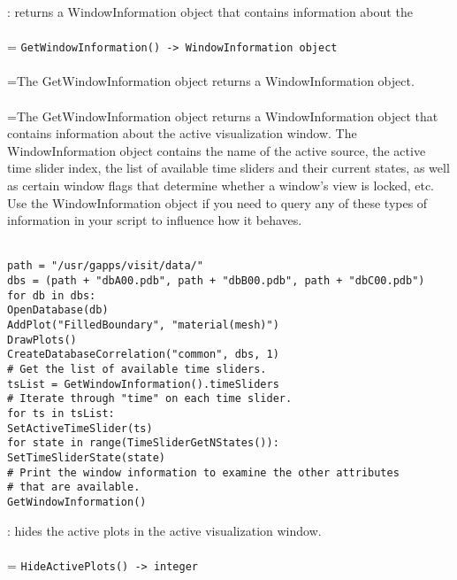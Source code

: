 \documentclass[10pt,a4paper]{report}
\begin{document}
{}
: returns a WindowInformation object that contains information about the\\[-3mm]

 \\ 
\hangindent=\parindent 
\verb!GetWindowInformation() -> WindowInformation object!\\ [-3mm]

 \\ 
\hangindent=\parindent The GetWindowInformation object returns a WindowInformation object. \\[-3mm] 

 \\ 
\hangindent=\parindent The GetWindowInformation object returns a WindowInformation object that contains information about the active visualization window. The WindowInformation object contains the name of the active source, the active time slider index, the list of available time sliders and their current states, as well as certain window flags that determine whether a window's view is locked, etc. Use the WindowInformation object if you need to query any of these types of information in your script to influence how it behaves. \\[-3mm] 

\\[-6mm]
\begin{verbatim}path = "/usr/gapps/visit/data/"
dbs = (path + "dbA00.pdb", path + "dbB00.pdb", path + "dbC00.pdb")
for db in dbs:
OpenDatabase(db)
AddPlot("FilledBoundary", "material(mesh)")
DrawPlots()
CreateDatabaseCorrelation("common", dbs, 1)
# Get the list of available time sliders.
tsList = GetWindowInformation().timeSliders
# Iterate through "time" on each time slider.
for ts in tsList:
SetActiveTimeSlider(ts)
for state in range(TimeSliderGetNStates()):
SetTimeSliderState(state)
# Print the window information to examine the other attributes
# that are available.
GetWindowInformation()
\end{verbatim}
\newpage


{}
: hides the active plots in the active visualization window.\\[-3mm]

 \\ 
\hangindent=\parindent 
\verb!HideActivePlots() -> integer!\\ [-3mm]
\end{document}
